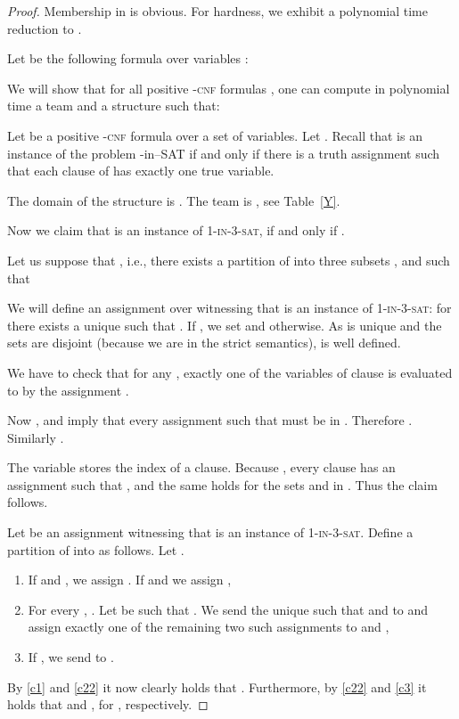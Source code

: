 \documentclass{article}
\theoremstyle{plain}
\theoremstyle{definition}
\newcommand{\pb}[1]{\textsc{#1}}
\begin{document}
\begin{proof} Membership in  is obvious. For hardness, we exhibit a polynomial time reduction to . 

Let  be the following formula over variables :



	We will show that for all   positive -\pb{cnf} formulas , one can compute in polynomial time a team  and a structure  such that:
	
Let  be a positive -\pb{cnf} formula over a set  of variables. Let .  Recall that  is an instance of  the problem -in--SAT if and only if there is a truth assignment such that each  clause of  has exactly one true variable.
	
The domain of the structure  is . The team  is , see Table~\ref{Y}.
\begin{table}
	
\caption{\label{Y}}
\end{table}

	Now we claim that  is an instance of \pb{1-in-3-sat}, if and only if 
	.

Let us suppose that , i.e., there exists a partition of  into three subsets ,  and  such that 
			
			
			We will define  an assignment  over  witnessing that  is an instance of \pb{1-in-3-sat}: for  there exists a unique  such that . If , we set  and  otherwise. As  is unique and the sets   are disjoint (because we are in the strict semantics),  is well defined.
			
			We have to check that for any ,  exactly one of the  variables of clause  is evaluated to  by the assignment .
			
		Now 	,  and  imply that every assignment  such that  must be in . Therefore .	Similarly .

			The variable    stores the index of a clause. Because , every clause  has an assignment  such that , and the same holds for the sets    and in . Thus the claim follows.
			
Let  be an assignment witnessing that  is an instance of \pb{1-in-3-sat}. Define a partition of  into  as follows. Let .
		
		\begin{enumerate}
		    \item\label{c1}  If  and , we assign . If  and  we assign ,
		    \item\label{c22} 	For every , . Let  be such that . We send the unique  such that  and  to  and assign exactly one of the remaining two such assignments  to  and ,\item\label{c3} If ,  we send  to . 
		\end{enumerate}
		 By \eqref{c1} and \eqref{c22} it now  clearly holds that  . Furthermore, by \eqref{c22} and \eqref{c3} it holds that  and    , for  , respectively.


		
		
		
\end{proof}
\end{document}
